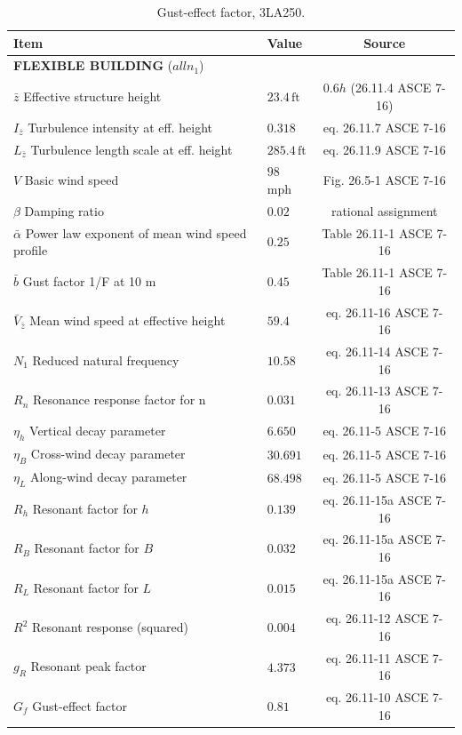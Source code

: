 \documentclass{simcenterdocumentation}
\newcommand{\ft}{\ensuremath{\,\mathrm{ft}}}
\begin{document}
\begin{table}[H]
\centering \caption{Gust-effect factor, 3LA250.}
\label{tab:gust_factor_3SE250}
\begin{tabular}{llc}
\toprule
Item		& Value		& Source		\\
\midrule
\multicolumn{3}{l}{\textbf{FLEXIBLE BUILDING} ($all n_1$)}	\\
$\bar{z}$ Effective structure height							& $23.4 \ft$					& $0.6h$ (26.11.4 ASCE 7-16)	\\
$I_{\bar{z}}$ Turbulence intensity at eff. height				& $0.318$						& eq. 26.11.7 ASCE 7-16			\\
$L_{\bar{z}}$ Turbulence length scale at eff. height			& $285.4 \ft$					& eq. 26.11.9 ASCE 7-16			\\
$V$ Basic wind speed											& $98$ mph						& Fig. 26.5-1 ASCE 7-16			\\
$\beta$ Damping ratio											& $0.02$						& rational assignment			\\
$\bar{\alpha}$ Power law exponent of mean wind speed profile	& $0.25$						& Table 26.11-1 ASCE 7-16		\\
$\bar{b}$ Gust factor 1/F at 10 m								& $0.45$						& Table 26.11-1 ASCE 7-16		\\
$\bar{V}_{\bar{z}}$ Mean wind speed at effective height			& $59.4$						& eq. 26.11-16 ASCE 7-16		\\
$N_1$ Reduced natural frequency									& $10.58$						& eq. 26.11-14 ASCE 7-16		\\
$R_n$ Resonance response factor for n							& $0.031$						& eq. 26.11-13 ASCE 7-16		\\
$\eta_h$ Vertical decay parameter								& $6.650$						& eq. 26.11-5 ASCE 7-16			\\
$\eta_B$ Cross-wind decay parameter								& $30.691$						& eq. 26.11-5 ASCE 7-16			\\
$\eta_L$ Along-wind decay parameter								& $68.498$						& eq. 26.11-5 ASCE 7-16			\\
$R_h$ Resonant factor for $h$									& $0.139$							& eq. 26.11-15a ASCE 7-16			\\
$R_B$ Resonant factor for $B$									& $0.032$							& eq. 26.11-15a ASCE 7-16			\\
$R_L$ Resonant factor for $L$									& $0.015$							& eq. 26.11-15a ASCE 7-16			\\
$R^2$ Resonant response (squared)								& $0.004$							& eq. 26.11-12 ASCE 7-16			\\
$g_R$ Resonant peak factor										& $4.373$							& eq. 26.11-11 ASCE 7-16			\\
$G_f$ Gust-effect factor										& $0.81$							& eq. 26.11-10 ASCE 7-16			\\
\bottomrule
\end{tabular}
\end{table}
\end{document}
